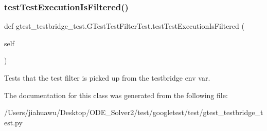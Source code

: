 \subsubsection{\texorpdfstring{test\+Test\+Execution\+Is\+Filtered()}{testTestExecutionIsFiltered()}}
{\footnotesize\ttfamily def gtest\+\_\+testbridge\+\_\+test.\+G\+Test\+Test\+Filter\+Test.\+test\+Test\+Execution\+Is\+Filtered (\begin{DoxyParamCaption}\item[{}]{self }\end{DoxyParamCaption})}

\begin{DoxyVerb}Tests that the test filter is picked up from the testbridge env var.\end{DoxyVerb}
 

The documentation for this class was generated from the following file\+:\begin{DoxyCompactItemize}
\item 
/\+Users/jiahuawu/\+Desktop/\+O\+D\+E\+\_\+\+Solver2/test/googletest/test/gtest\+\_\+testbridge\+\_\+test.\+py\end{DoxyCompactItemize}
